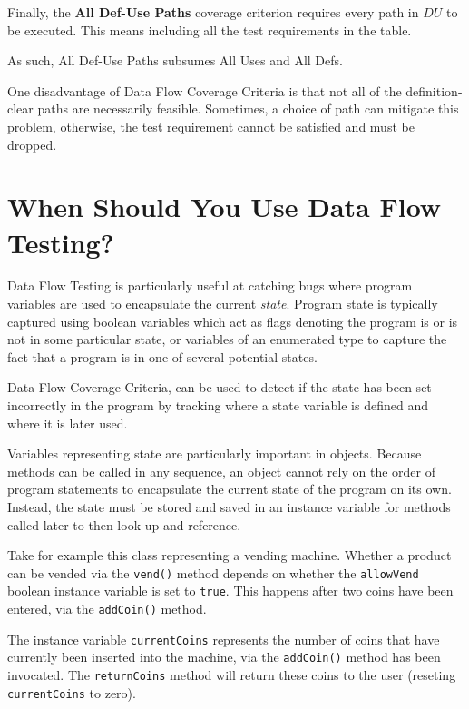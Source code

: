 Finally, the {\bf All Def-Use Paths} coverage criterion requires every path in
$DU$ to be executed. This means including all the test requirements in the table.


As such, All Def-Use Paths subsumes All Uses and All Defs.

One disadvantage of Data Flow Coverage Criteria is that not all of the
definition-clear paths are necessarily feasible. Sometimes, a choice of path can
mitigate this problem, otherwise, the test requirement cannot be satisfied and
must be dropped.



\section{When Should You Use Data Flow Testing?}

Data Flow Testing is particularly useful at catching bugs where program
variables are used to encapsulate the current {\it state}. Program state is
typically captured using boolean variables which act as flags denoting the
program is or is not in some particular state, or variables of an enumerated
type to capture the fact that a program is in one of several potential states.

Data Flow Coverage Criteria, can be used to detect if the state has been set
incorrectly in the program by tracking where a state variable is defined and
where it is later used. 

Variables representing state are particularly important in objects. Because
methods can be called in any sequence, an object cannot rely on the order of
program statements to encapsulate the current state of the program on its own.
Instead, the state must be stored and saved in an instance variable for methods
called later to then look up and reference.


Take for example this class representing a vending machine. Whether a product
can be vended via the {\tt vend()} method depends on whether the {\tt allowVend}
boolean instance variable is set to {\tt true}. This happens after two coins
have been entered, via the {\tt addCoin()} method.


The instance variable {\tt currentCoins} represents the number of coins that
have currently been inserted into the machine, via the {\tt addCoin()} method
has been invocated. The {\tt returnCoins} method will return these
coins to the user (reseting {\tt currentCoins} to zero).

